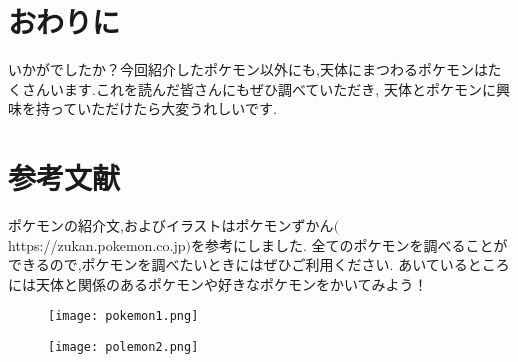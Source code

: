 \documentclass{article}
\begin{document}
\section{おわりに}
いかがでしたか？今回紹介したポケモン以外にも,天体にまつわるポケモンはたくさんいます.これを読んだ皆さんにもぜひ調べていただき,
天体とポケモンに興味を持っていただけたら大変うれしいです.
\section{参考文献}
ポケモンの紹介文,およびイラストはポケモンずかん$($https://zukan.pokemon.co.jp$)$を参考にしました.
全てのポケモンを調べることができるので,ポケモンを調べたいときにはぜひご利用ください.
\newpage
あいているところには天体と関係のあるポケモンや好きなポケモンをかいてみよう！
\vspace{2mm}
\begin{figure}[H]
\texttt{[image: pokemon1.png]}
\end{figure}
\begin{figure}[H]
\texttt{[image: polemon2.png]}
\end{figure}
\end{document}
